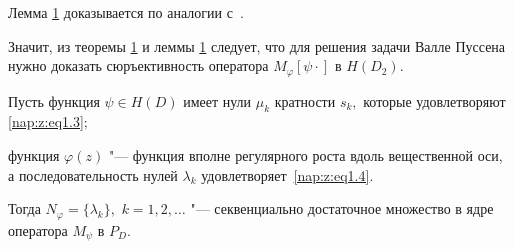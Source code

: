 Лемма \hyperlink{nap:z:l1}{1} доказывается по аналогии с~\cite{zabirova2_2}.



\smallskip



Значит, из теоремы \hyperlink{nap:z:t1}{1} и леммы \hyperlink{nap:z:l1}{1} следует, что для решения задачи Валле Пуссена нужно доказать сюръективность оператора $M_\varphi[\psi \cdot]$ в $H(D_2)$.



\smallskip




\hypertarget{nap:z:t2}{}



\begin{theorem}[2]Пусть функция $\psi\in H(D)$ имеет нули $\mu_k$ кратности $s_k,$  которые удовлетворяют \eqref{nap:z:eq1.3}$;$

функция $\varphi(z)$ "--- функция вполне регулярного роста вдоль вещественной оси, а последовательность нулей $\lambda_k$ удовлетворяет~\eqref{nap:z:eq1.4}$.$ 

Тогда $N_{\varphi}=\{ \lambda_k\},$ $k=1, 2, \ldots $ "--- секвенциально достаточное множество в ядре оператора $M_\psi$ в $P_D.$ 

\end{theorem}




\smallskip






